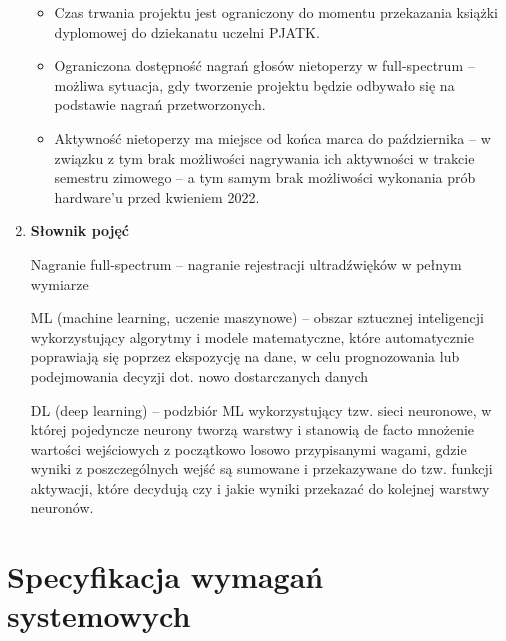 \documentclass{sprz}
\begin{document}
\begin{enumerate}[label=\textbf{\arabic*}.]
    \begin{itemize}
      \item Czas trwania projektu jest ograniczony do momentu przekazania książki dyplomowej do dziekanatu uczelni PJATK.
      \item Ograniczona dostępność nagrań głosów nietoperzy w full-spectrum – możliwa sytuacja, gdy tworzenie projektu będzie odbywało się na podstawie nagrań przetworzonych.
      \item Aktywność nietoperzy ma miejsce od końca marca do października – w związku z tym brak możliwości nagrywania ich aktywności w trakcie semestru zimowego – a tym samym brak możliwości wykonania prób hardware’u przed kwieniem 2022.
    \end{itemize}

  \item \textbf{Słownik pojęć}
  
    Nagranie full-spectrum – nagranie rejestracji ultradźwięków w pełnym wymiarze

    ML (machine learning, uczenie maszynowe) – obszar sztucznej inteligencji wykorzystujący algorytmy i modele matematyczne, które automatycznie poprawiają się poprzez ekspozycję na dane, w celu prognozowania lub podejmowania decyzji dot. nowo dostarczanych danych

    DL (deep learning) – podzbiór ML wykorzystujący tzw. sieci neuronowe, w której pojedyncze neurony tworzą warstwy i stanowią de facto mnożenie wartości wejściowych z początkowo losowo przypisanymi wagami, gdzie wyniki z poszczególnych wejść są sumowane i przekazywane do tzw. funkcji aktywacji, które decydują czy i jakie wyniki przekazać do kolejnej warstwy neuronów.

\end{enumerate}

\section{Specyfikacja wymagań systemowych}
\end{document}
